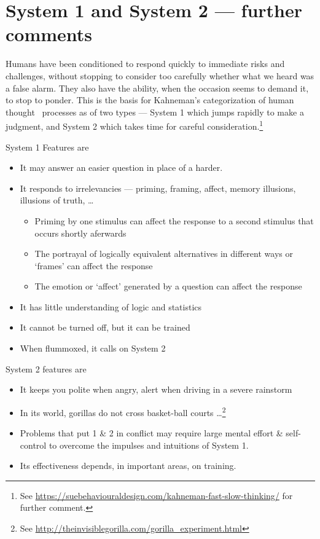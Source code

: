 \documentclass[
  10ptls,
  b5paper]{book}
\providecommand{\tightlist}{%
  \setlength{\itemsep}{0pt}\setlength{\parskip}{0pt}}
\begin{document}
\hypertarget{system-1-and-system-2-further-comments}{%
\section{System 1 and System 2 --- further comments}\label{system-1-and-system-2-further-comments}}

Humans have been conditioned to respond quickly to immediate risks and challenges, without stopping to consider too carefully whether what we heard was a false alarm. They also have the ability, when the occasion seems to demand it, to stop to ponder. This is the basis for Kahneman's categorization of human thought~ processes as of two types --- System 1 which jumps rapidly to make a judgment, and System 2 which takes time for careful consideration.\footnote{See \url{https://suebehaviouraldesign.com/kahneman-fast-slow-thinking/} for further comment.}

System 1 Features are

\begin{itemize}
\tightlist
\item
  It may answer an easier question in place of a harder.
\item
  It responds to irrelevancies --- priming, framing, affect, memory illusions, illusions of truth, \ldots{}

  \begin{itemize}
  \tightlist
  \item
    Priming by one stimulus can affect the response to a second
    stimulus that occurs shortly aferwards
  \item
    The portrayal of logically equivalent alternatives in different
    ways or `frames' can affect the response
  \item
    The emotion or `affect' generated by a question can affect the
    response
  \end{itemize}
\item
  It has little understanding of logic and statistics
\item
  It cannot be turned off, but it can be trained
\item
  When flummoxed, it calls on System 2
\end{itemize}

System 2 features are

\begin{itemize}
\tightlist
\item
  It keeps you polite when angry, alert when driving in a severe
  rainstorm
\item
  In its world, gorillas do not cross basket-ball courts \ldots{}\footnote{See \url{http://theinvisiblegorilla.com/gorilla_experiment.html}}
\item
  Problems that put 1 \& 2 in conflict may require large mental effort \& self-control to overcome the impulses and intuitions of System 1.
\item
  Its effectiveness depends, in important areas, on training.
\end{itemize}
\end{document}

